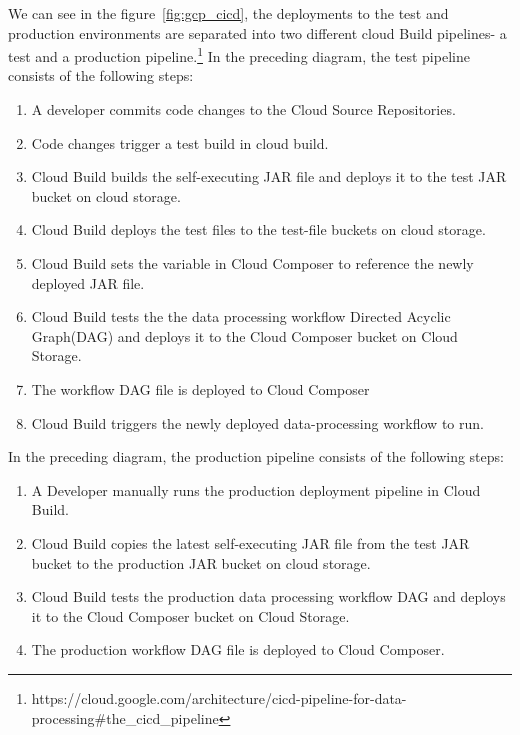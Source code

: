 \newline\newline\newline
We can see in the figure~\ref{fig:gcp_cicd},  the deployments to the test and production environments are separated into two different cloud Build pipelines- a test and a production pipeline.\footnote{https://cloud.google.com/architecture/cicd-pipeline-for-data-processing\#the\_cicd\_pipeline} 
\newline\newline     In the preceding diagram, the test pipeline consists of the following steps: 
\begin{enumerate}
    \item A developer commits code changes to the Cloud Source Repositories. 
    \item Code changes trigger a test build in cloud build.
    \item Cloud Build builds the self-executing JAR file and deploys it to the test JAR bucket on cloud storage. 
    \item Cloud Build deploys the test files to the test-file buckets on cloud storage.
    \item Cloud Build sets the variable in Cloud Composer to reference the newly deployed JAR file. 
    \item Cloud Build tests the the data processing workflow Directed Acyclic Graph(DAG) and deploys it to the Cloud Composer bucket on Cloud Storage.
    \item The workflow DAG file is deployed to Cloud Composer 
    \item Cloud Build triggers the newly deployed data-processing workflow to run. 
\end{enumerate}
\newline
In the preceding diagram, the production pipeline consists of the following steps: 
\begin{enumerate}
    \item A Developer manually runs the production deployment pipeline in Cloud Build.
    \item Cloud Build copies the latest self-executing JAR file from the test JAR bucket to the production JAR bucket on cloud storage. 
    \item Cloud Build tests the production data processing workflow DAG and deploys it to the Cloud Composer bucket on Cloud Storage. 
    \item The production workflow DAG file is deployed to Cloud Composer.
\end{enumerate}


